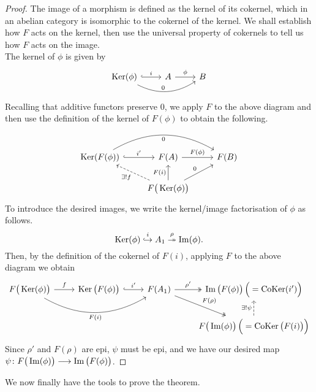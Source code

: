 \documentclass[a4paper]{article}
\def\into{\hookrightarrow}
\def\epi{\twoheadrightarrow}
\begin{document}
\begin{proof}
    The image of a morphism is defined as the kernel of its cokernel, which in an abelian category is isomorphic to the cokernel of the kernel. We shall establish how $F$ acts on the kernel, then use the universal property of cokernels to tell us how $F$ acts on the image.\\
    The kernel of $\phi$ is given by
    \[
        \begin{tikzcd}
            \Ker(\phi) \arrow[r, "i", hook] \arrow[rr, "0", bend right] & A \arrow[r, "\phi"] & B
        \end{tikzcd}
    \]
    Recalling that additive functors preserve $0$, we apply $F$ to the above diagram and then use the definition of the kernel of $F(\phi)$ to obtain the following.
    \[
        \begin{tikzcd}
            \Ker(F(\phi)) \arrow[r, "i'", hook] \arrow[rr, "0"', bend left] & F(A) \arrow[r, "F(\phi)"] & F(B) \\
                & F\big(\Ker(\phi)\big) \arrow[ul, "\exists ! f", dashed] \arrow[ur, "0"] \arrow[u, "F(i)"]&
        \end{tikzcd}
    \]
    To introduce the desired images, we write the kernel/image factorisation of $\phi$ as follows.
    \[
        \Ker(\phi) \stackrel{i}{\into} A_1 \stackrel{\rho}{\epi} \im(\phi).
    \]
    Then, by the definition of the cokernel of $F(i)$, applying $F$ to the above diagram we obtain
    \[
        \begin{tikzcd}
            F\big( \Ker(\phi) \big) \arrow[r, "f"] \arrow[rr, "F(i)"', bend right] & \Ker\big( F(\phi) \big) \arrow[r, "i'", hook] & F(A_1) \arrow[r, "\rho'", two heads] \arrow[rd, "F(\rho)", two heads] & \im\big(F(\phi)\big)\,  \Big(= \CoKer(i') \Big)\\
            & & & F\big(\im(\phi)\big)\, \Big( = \CoKer\big( F(i) \big)\Big) \arrow[u, "\exists! \psi", dashed]
        \end{tikzcd}
    \]
    Since $\rho'$ and $F(\rho)$ are epi, $\psi$ must be epi, and we have our desired map $\psi\colon F\big(\operatorname{Im}(\phi)\big)\longrightarrow \operatorname{Im}\big(F(\phi)\big)$.
\end{proof}
We now finally have the tools to prove the theorem.
\end{document}
